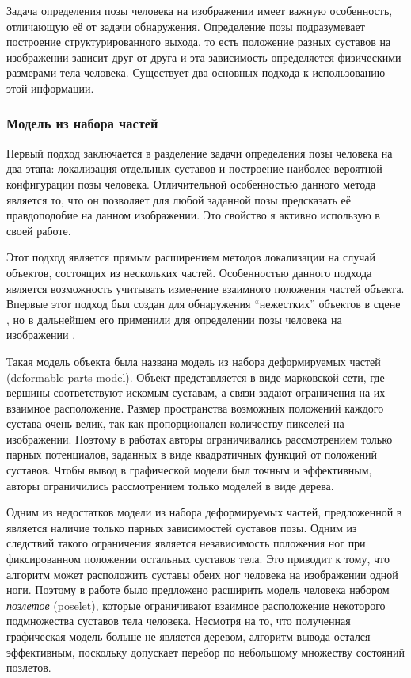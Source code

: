 Задача определения позы человека на изображении имеет важную особенность, отличающую её от задачи обнаружения. Определение позы подразумевает построение структурированного выхода, то есть положение разных суставов на изображении зависит друг от друга и эта зависимость определяется физическими размерами тела человека. Существует два основных подхода к использованию этой информации.

\subsubsection{Модель из набора частей}

Первый подход заключается в разделение задачи определения позы человека на два этапа: локализация отдельных суставов и построение наиболее вероятной конфигурации позы человека. Отличительной особенностью данного метода является то, что он позволяет для любой заданной позы предсказать её правдоподобие на данном изображении. Это свойство я активно использую в своей работе.

Этот подход является прямым расширением методов локализации на случай объектов, состоящих из нескольких частей. Особенностью данного подхода является возможность учитывать изменение взаимного положения частей объекта. Впервые этот подход был создан для обнаружения ``нежестких'' объектов в сцене \cite{felzenszwalb2008discriminatively}, но в дальнейшем его применили для определении позы человека на изображении \cite{yang2011articulated}.

Такая модель объекта была названа модель из набора деформируемых частей (deformable parts model). Объект представляется в виде марковской сети, где вершины соответствуют искомым суставам, а связи задают ограничения на их взаимное расположение. Размер пространства возможных положений каждого сустава очень велик, так как пропорционален количеству пикселей на изображении. Поэтому в работах \cite{yang2011articulated,pirsiavash2012steerable} авторы ограничивались рассмотрением только парных потенциалов, заданных в виде квадратичных функций от положений суставов. Чтобы вывод в графической модели был точным и эффективным, авторы ограничились рассмотрением только моделей в виде дерева.

Одним из недостатков модели из набора деформируемых частей, предложенной в \cite{yang2011articulated} является наличие только парных зависимостей суставов позы. Одним из следствий такого ограничения является независимость положения ног при фиксированном положении остальных суставов тела. Это приводит к тому, что алгоритм может расположить суставы обеих ног человека на изображении одной ноги. Поэтому в работе \cite{pishchulin2013poselet} было предложено расширить модель человека набором \textit{позлетов} (poselet), которые ограничивают взаимное расположение некоторого подмножества суставов тела человека. Несмотря на то, что полученная графическая модель больше не является деревом, алгоритм вывода остался эффективным, поскольку допускает перебор по небольшому множеству состояний позлетов.

